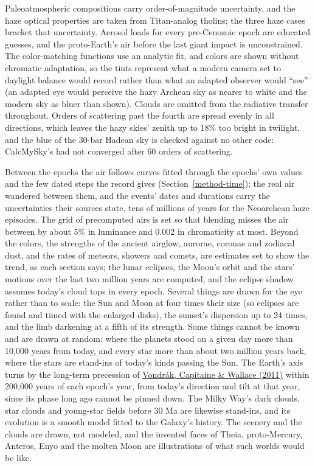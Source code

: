 \documentclass[9pt,twocolumn]{extarticle}
\begin{document}
Paleoatmospheric compositions carry order-of-magnitude uncertainty, and the haze optical properties are taken from Titan-analog tholins; the three haze cases bracket that uncertainty. Aerosol loads for every pre-Cenozoic epoch are educated guesses, and the proto-Earth's air before the last giant impact is unconstrained. The color-matching functions use an analytic fit, and colors are shown without chromatic adaptation, so the tints represent what a modern camera set to daylight balance would record rather than what an adapted observer would ``see'' (an adapted eye would perceive the hazy Archean sky as nearer to white and the modern sky as bluer than shown). Clouds are omitted from the radiative transfer throughout. Orders of scattering past the fourth are spread evenly in all directions, which leaves the hazy skies' zenith up to 18\% too bright in twilight, and the blue of the 30-bar Hadean sky is checked against no other code: CalcMySky's had not converged after 60 orders of scattering.

Between the epochs the air follows curves fitted through the epochs' own values and the few dated steps the record gives (Section~\ref{method-time}); the real air wandered between them, and the events' dates and durations carry the uncertainties their sources state, tens of millions of years for the Neoarchean haze episodes. The grid of precomputed airs is set so that blending misses the air between by about 5\% in luminance and 0.002 in chromaticity at most. Beyond the colors, the strengths of the ancient airglow, aurorae, coronae and zodiacal dust, and the rates of meteors, showers and comets, are estimates set to show the trend, as each section says; the lunar eclipses, the Moon's orbit and the stars' motions over the last two million years are computed, and the eclipse shadow assumes today's cloud tops in every epoch. Several things are drawn for the eye rather than to scale: the Sun and Moon at four times their size (so eclipses are found and timed with the enlarged disks), the sunset's dispersion up to 24 times, and the limb darkening at a fifth of its strength. Some things cannot be known and are drawn at random: where the planets stood on a given day more than 10,000 years from today, and every star more than about two million years back, where the stars are stand-ins of today's kinds passing the Sun. The Earth's axis turns by the long-term precession of \protect\hyperlink{cite.vondrak2011}{Vondrák, Capitaine \& Wallace (2011)} within 200,000 years of each epoch's year, from today's direction and tilt at that year, since its phase long ago cannot be pinned down. The Milky Way's dark clouds, star clouds and young-star fields before 30 Ma are likewise stand-ins, and its evolution is a smooth model fitted to the Galaxy's history. The scenery and the clouds are drawn, not modeled, and the invented faces of Theia, proto-Mercury, Anteros, Enyo and the molten Moon are illustrations of what such worlds would be like.
\end{document}

